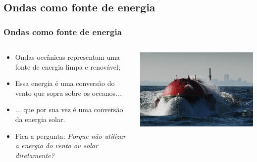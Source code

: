 \subsection{Ondas como fonte de energia}
\begin{frame}
    \frametitle{Ondas como fonte de energia}
    \begin{columns}
        \begin{column}{0.5\textwidth}
        \small{
            \begin{itemize}[<+-| alert@+>]
                \item Ondas oceânicas representam uma fonte de energia limpa e
                      renovável;
                \item Essa energia é uma conversão do vento que sopra sobre os
                      oceanos...
                \item ... que por sua vez é uma conversão da energia solar.
                \item Fica a pergunta: {\it Porque não utilizar a energia do
                     vento ou solar diretamente?}
            \end{itemize}
            }
        \end{column}
        \begin{column}{0.5\textwidth}
            \begin{center}
                \includegraphics[scale=0.4]{./figures/Pelamis_bursts_out_of_a_wave.jpg}
            \end{center}
        \end{column}
    \end{columns}
\end{frame}

